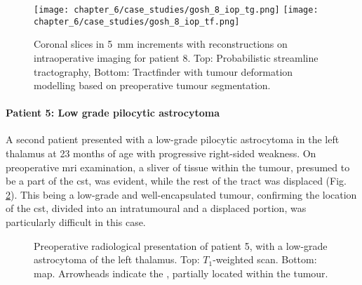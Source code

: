 \begin{figure}
  \texttt{[image: chapter\_6/case\_studies/gosh\_8\_iop\_tg.png]}
  \texttt{[image: chapter\_6/case\_studies/gosh\_8\_iop\_tf.png]}
  \caption[GOSH iMRI patient 8, intraoperative imaging, corticospinal tract reconstructions]{Coronal slices in 5~mm increments with  reconstructions on intraoperative imaging for patient 8. Top: Probabilistic streamline tractography, Bottom: Tractfinder  with tumour deformation modelling based on preoperative tumour segmentation.}
  \label{fig:8i_tf}
\end{figure}

\paragraph*{Patient 5: Low grade pilocytic astrocytoma}

A second patient presented with a low-grade pilocytic astrocytoma in the left thalamus at 23 months of age with progressive right-sided weakness.
On preoperative \gls{mri} examination, a sliver of tissue within the tumour, presumed to be a part of the \gls{cst}, was evident, while the rest of the tract was displaced (Fig. \ref{fig:5p}).
This being a low-grade and well-encapsulated tumour, confirming the location of the \gls{cst}, divided into an intratumoural and a displaced portion, was particularly difficult in this case.

\begin{figure}[htb!]
  \centering
  
  
  \caption[GOSH iMRI patient 5, preoperative imaging]{Preoperative radiological presentation of  patient 5, with a low-grade astrocytoma of the left thalamus. Top: $T_1$-weighted scan. Bottom:    map. Arrowheads indicate the , partially located within the tumour.}
  \label{fig:5p}
\end{figure}

